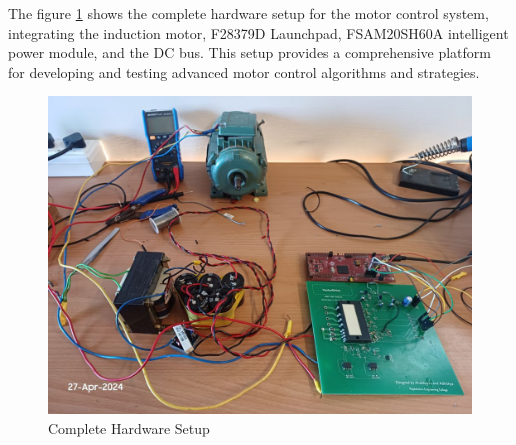 
The figure \ref{fig:Complete Hardware Setup} shows the complete hardware setup for the motor control system, integrating the induction motor, F28379D Launchpad, FSAM20SH60A intelligent power module, and the DC bus. This setup provides a comprehensive platform for developing and testing advanced motor control algorithms and strategies.

\begin{figure}[H]
	\centering
	\includegraphics[width=6in]{sections/section6/images/hardwareSetup/fullSetupWithMotorAndIPM.jpg}
	\caption{Complete Hardware Setup}
	\label{fig:Complete Hardware Setup}
\end{figure}
\newpage